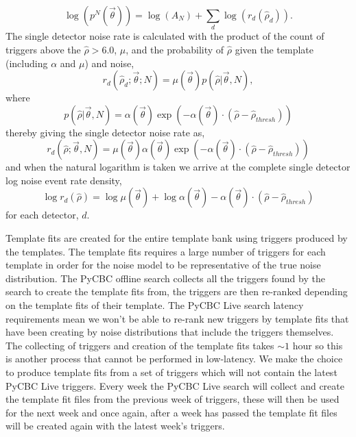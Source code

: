 %
\begin{equation}
    \log(p^{N}(\Vec{\theta})) = \log(A_{N}) +  \sum_{d} \log(r_{d}(\hat{\rho}_{d})) .
\label{5:eqn:comb-log-noise-rate}
\end{equation}
%
The single detector noise rate is calculated with the product of the count of triggers above the $\hat{\rho} > 6.0$, $\mu$, and the probability of $\hat{\rho}$ given the template (including $\alpha$ and $\mu$) and noise,
%
\begin{equation}
    r_{d}(\hat{\rho}_{d}; {\Vec{\theta}}; N) = \mu(\Vec{\theta}) p(\hat{\rho} | \Vec{\theta}, N) ,
\label{5:eqn:single-noise-rate}
\end{equation}
%
where
%
\begin{equation}
    p(\hat{\rho} | \Vec{\theta}, N) = \alpha(\Vec{\theta}) \exp\left(-\alpha(\Vec{\theta})\cdot\left(\hat{\rho} - \hat{\rho}_{thresh}\right)\right)
\label{5:eqn:p-definition}
\end{equation}
%
thereby giving the single detector noise rate as,
%
\begin{equation}
    r_{d}(\hat{\rho}; {\Vec{\theta}}, N) = \mu(\Vec{\theta}) \alpha(\Vec{\theta}) \exp\left(-\alpha(\Vec{\theta}) \cdot (\hat{\rho} - \hat{\rho}_{thresh})\right)
\label{5:eqn:single-noise-rate-full}
\end{equation}
%
and when the natural logarithm is taken we arrive at the complete single detector log noise event rate density,
%
\begin{equation}
    \log r_{d}(\hat{\rho}) = \log\mu(\Vec{\theta}) +  \log\alpha(\Vec{\theta}) - \alpha(\Vec{\theta}) \cdot(\hat{\rho} - \hat{\rho}_{thresh})
\label{5:eqn:single-log-noise-rate}
\end{equation}
%
for each detector, $d$.

Template fits are created for the entire template bank using triggers produced by the templates. The template fits requires a large number of triggers for each template in order for the noise model to be representative of the true noise distribution. The PyCBC offline search collects all the triggers found by the search to create the template fits from, the triggers are then re-ranked depending on the template fits of their template. The PyCBC Live search latency requirements mean we won't be able to re-rank new triggers by template fits that have been creating by noise distributions that include the triggers themselves. The collecting of triggers and creation of the template fits takes $\sim 1$ hour so this is another process that cannot be performed in low-latency. We make the choice to produce template fits from a set of triggers which will not contain the latest PyCBC Live triggers. Every week the PyCBC Live search will collect and create the template fit files from the previous week of triggers, these will then be used for the next week and once again, after a week has passed the template fit files will be created again with the latest week's triggers. 

